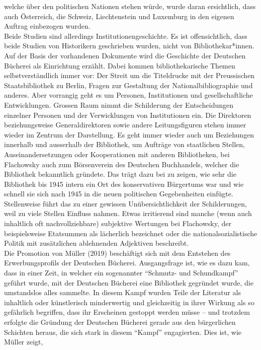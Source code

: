 \documentclass[a4paper,
fontsize=11pt,
oneside,
numbers=noperiodatend,
parskip=half-,
bibliography=totoc,
final
]{scrartcl}
\begin{document}
welche über den politischen Nationen stehen würde, wurde daran
ersichtlich, dass auch Österreich, die Schweiz, Liechtenstein und
Luxemburg in den eigenen Auftrag einbezogen wurden.\\
Beide Studien sind allerdings Institutionengeschichte. Es ist
offensichtlich, dass beide Studien von Historikern geschrieben wurden,
nicht von Bibliothekar*innen. Auf der Basis der vorhandenen Dokumente
wird die Geschichte der Deutschen Bücherei als Einrichtung erzählt.
Dabei kommen bibliothekarische Themen selbstverständlich immer vor: Der
Streit um die Titeldrucke mit der Preussischen Staatsbibliothek zu
Berlin, Fragen zur Gestaltung der Nationalbibliographie und anderes.
Aber vorrangig geht es um Personen, Institutionen und gesellschaftliche
Entwicklungen. Grossen Raum nimmt die Schilderung der Entscheidungen
einzelner Personen und der Verwicklungen von Institutionen ein. Die
Direktoren beziehungsweise Generaldirektoren sowie andere
Leitungsfiguren stehen immer wieder im Zentrum der Darstellung. Es geht
immer wieder auch um Beziehungen innerhalb und ausserhalb der
Bibliothek, um Aufträge von staatlichen Stellen, Auseinandersetzungen
oder Kooperationen mit anderen Bibliotheken, bei Flachowsky auch zum
Börsenverein des Deutschen Buchhandels, welcher die Bibliothek
bekanntlich gründete. Das trägt dazu bei zu zeigen, wie sehr die
Bibliothek bis 1945 intern ein Ort des konservativen Bürgertums war und
wie schnell sie sich nach 1945 in die neuen politischen Gegebenheiten
einfügte. Stellenweise führt das zu einer gewissen Unübersichtlichkeit
der Schilderungen, weil zu viele Stellen Einfluss nahmen. Etwas
irritierend sind manche (wenn auch inhaltlich oft nachvollziehbare)
subjektive Wertungen bei Flachowsky, der beispielsweise Etatsummen als
lächerlich bezeichnet oder die nationalsozialistische Politik mit
zusätzlichen ablehnenden Adjektiven beschreibt.\\
Die Promotion von Müller (2019) beschäftigt sich mit dem Entstehen des
Erwerbungsprofils der Deutschen Bücherei. Ausgangsfrage ist, wie es dazu
kam, dass in einer Zeit, in welcher ein sogenannter ``Schmutz- und
Schundkampf'' geführt wurde, mit der Deutschen Bücherei eine Bibliothek
gegründet wurde, die umstandslos alles sammelte. In diesem Kampf wurden
Teile der Literatur als inhaltlich oder künstlerisch minderwertig und
gleichzeitig in ihrer Wirkung als so gefährlich begriffen, dass ihr
Erscheinen gestoppt werden müsse -- und trotzdem erfolgte die Gründung
der Deutschen Bücherei gerade aus den bürgerlichen Schichten heraus, die
sich stark in diesem ``Kampf'' engagierten. Dies ist, wie Müller zeigt,
\end{document}
